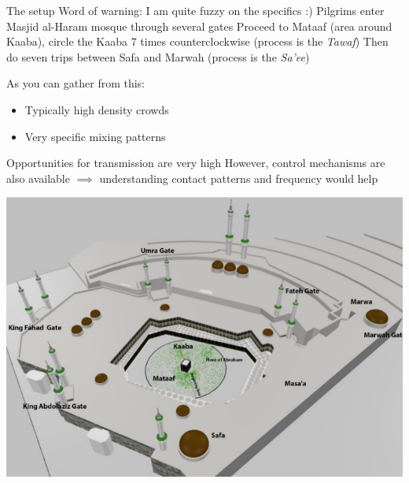 \documentclass[aspectratio=43]{beamer}
\begin{document}
\begin{frame}{The setup}
Word of warning: I am quite fuzzy on the specifics :)
\vfill
Pilgrims enter Masjid al-Haram mosque through several gates
\vfill
Proceed to Mataaf (area around Kaaba), circle the Kaaba 7 times counterclockwise (process is the \emph{Tawaf})
\vfill
Then do seven trips between Safa and Marwah (process is the \emph{Sa'ee})
\end{frame}


% 
% 

\begin{frame}
As you can gather from this:
\begin{itemize}
\item Typically high density crowds
\item Very specific mixing patterns
\end{itemize}
\vfill
Opportunities for transmission are very high
\vfill
However, control mechanisms are also available
\vfill
$\implies$ understanding contact patterns and frequency would help
\end{frame}


\begin{frame}
\begin{center}
\includegraphics[width=\textwidth]{FIGS/ABM_Hajj_MAH_3Dmodel.png}
\end{center}
\end{frame}
\end{document}
